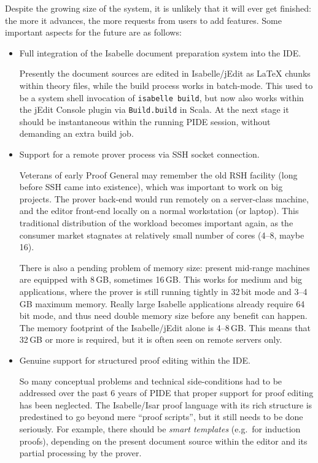 \begin{isabellebody}
\begin{isamarkuptext}
\medskip Despite the growing size of the system, it is unlikely that it will
ever get finished: the more it advances, the more requests from users to add
features. Some important aspects for the future are as follows:

\begin{itemize}

\item Full integration of the Isabelle document preparation system into the
IDE.

Presently the document sources are edited in Isabelle/jEdit as {\LaTeX}
chunks within theory files, while the build process works in batch-mode.
This used to be a system shell invocation of \verb|isabelle build|,
but now also works within the jEdit Console plugin via \verb|Build.build| in Scala. At the next stage it should be instantaneous within
the running PIDE session, without demanding an extra build job.

\item Support for a remote prover process via SSH socket connection.

Veterans of early Proof General may remember the old RSH facility (long
before SSH came into existence), which was important to work on big
projects. The prover back-end would run remotely on a server-class machine,
and the editor front-end locally on a normal workstation (or laptop). This
traditional distribution of the workload becomes important again, as the
consumer market stagnates at relatively small number of cores (4--8, maybe
16).

There is also a pending problem of memory size: present mid-range machines
are equipped with 8\,GB, sometimes 16\,GB. This works for medium and big
applications, where the prover is still running tightly in 32\,bit mode and
3--4\,GB maximum memory. Really large Isabelle applications already require
64\,bit mode, and thus need double memory size before any benefit can
happen. The memory footprint of the Isabelle/jEdit alone is 4--8\,GB. This
means that 32\,GB or more is required, but it is often seen on remote
servers only.

\item Genuine support for structured proof editing within the IDE.

So many conceptual problems and technical side-conditions had to be
addressed over the past 6 years of PIDE that proper support for proof
editing has been neglected. The Isabelle/Isar proof language with its rich
structure is predestined to go beyond mere ``proof scripts'', but it still
needs to be done seriously. For example, there should be \emph{smart
templates} (e.g.\ for induction proofs), depending on the present document
source within the editor and its partial processing by the prover.


\end{itemize}
\end{isamarkuptext}
\end{isabellebody}
